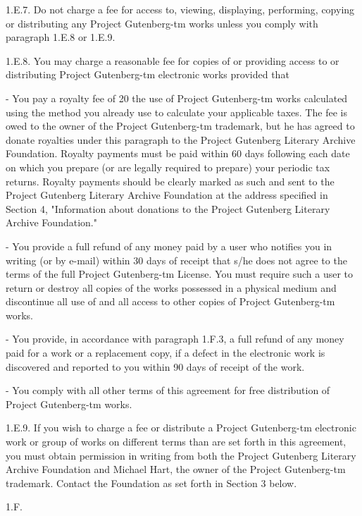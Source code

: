 \begin{PGtext}
1.E.7.  Do not charge a fee for access to, viewing, displaying,
performing, copying or distributing any Project Gutenberg-tm works
unless you comply with paragraph 1.E.8 or 1.E.9.

1.E.8.  You may charge a reasonable fee for copies of or providing
access to or distributing Project Gutenberg-tm electronic works provided
that

- You pay a royalty fee of 20%
     the use of Project Gutenberg-tm works calculated using the method
     you already use to calculate your applicable taxes.  The fee is
     owed to the owner of the Project Gutenberg-tm trademark, but he
     has agreed to donate royalties under this paragraph to the
     Project Gutenberg Literary Archive Foundation.  Royalty payments
     must be paid within 60 days following each date on which you
     prepare (or are legally required to prepare) your periodic tax
     returns.  Royalty payments should be clearly marked as such and
     sent to the Project Gutenberg Literary Archive Foundation at the
     address specified in Section 4, "Information about donations to
     the Project Gutenberg Literary Archive Foundation."

- You provide a full refund of any money paid by a user who notifies
     you in writing (or by e-mail) within 30 days of receipt that s/he
     does not agree to the terms of the full Project Gutenberg-tm
     License.  You must require such a user to return or
     destroy all copies of the works possessed in a physical medium
     and discontinue all use of and all access to other copies of
     Project Gutenberg-tm works.

- You provide, in accordance with paragraph 1.F.3, a full refund of any
     money paid for a work or a replacement copy, if a defect in the
     electronic work is discovered and reported to you within 90 days
     of receipt of the work.

- You comply with all other terms of this agreement for free
     distribution of Project Gutenberg-tm works.

1.E.9.  If you wish to charge a fee or distribute a Project Gutenberg-tm
electronic work or group of works on different terms than are set
forth in this agreement, you must obtain permission in writing from
both the Project Gutenberg Literary Archive Foundation and Michael
Hart, the owner of the Project Gutenberg-tm trademark.  Contact the
Foundation as set forth in Section 3 below.

1.F.


\end{PGtext}

